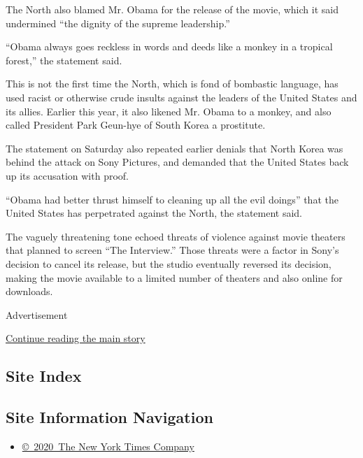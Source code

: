 The North also blamed Mr. Obama for the release of the movie, which it
said undermined ``the dignity of the supreme leadership.''

``Obama always goes reckless in words and deeds like a monkey in a
tropical forest,'' the statement said.

This is not the first time the North, which is fond of bombastic
language, has used racist or otherwise crude insults against the leaders
of the United States and its allies. Earlier this year, it also likened
Mr. Obama to a monkey, and also called President Park Geun-hye of South
Korea a prostitute.

The statement on Saturday also repeated earlier denials that North Korea
was behind the attack on Sony Pictures, and demanded that the United
States back up its accusation with proof.

``Obama had better thrust himself to cleaning up all the evil doings''
that the United States has perpetrated against the North, the statement
said.

The vaguely threatening tone echoed threats of violence against movie
theaters that planned to screen ``The Interview.'' Those threats were a
factor in Sony's decision to cancel its release, but the studio
eventually reversed its decision, making the movie available to a
limited number of theaters and also online for downloads.

Advertisement

\protect\hyperlink{after-bottom}{Continue reading the main story}

\hypertarget{site-index}{%
\subsection{Site Index}\label{site-index}}

\hypertarget{site-information-navigation}{%
\subsection{Site Information
Navigation}\label{site-information-navigation}}

\begin{itemize}
\tightlist
\item
  \href{https://help.nytimes3xbfgragh.onion/hc/en-us/articles/115014792127-Copyright-notice}{©~2020~The
  New York Times Company}
\end{itemize}

